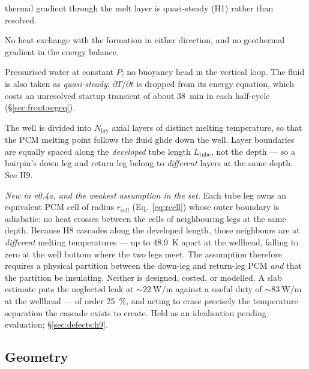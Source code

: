 \begin{description}[leftmargin=1.6em,itemsep=2pt]
  thermal gradient through the melt layer is quasi-steady (H1) rather than
  resolved.
\item[H6 --- Adiabatic borehole wall.] No heat exchange with the formation in
  either direction, and no geothermal gradient in the energy balance.
\item[H7 --- Incompressible, single-phase secondary fluid.] Pressurised water at
  constant $P$; no buoyancy head in the vertical loop. The fluid is also taken
  as \emph{quasi-steady}: $\partial T/\partial t$ is dropped from its energy
  equation, which costs an unresolved startup transient of about
  \SI{38}{\minute} in each half-cycle (\S\ref{sec:front:segeq}).
\item[H8 --- Multilayer PCM.] The well is divided into $N_{\mathrm{lay}}$ axial
  layers of distinct melting temperature, so that the PCM melting point follows
  the fluid glide down the well. Layer boundaries are equally spaced along the
  \emph{developed} tube length $L_{\mathrm{tube}}$, not the depth --- so a
  hairpin's down leg and return leg belong to \emph{different} layers at the
  same depth. See H9.
\item[H9 --- Perfect azimuthal insulation.] \emph{New in v0.4a, and the
  weakest assumption in the set.} Each tube leg owns an equivalent PCM cell of
  radius $r_{\mathrm{cell}}$ (Eq.~\eqref{eq:rcell}) whose outer boundary is
  adiabatic: no heat crosses between the cells of neighbouring legs at the same
  depth. Because H8 cascades along the developed length, those neighbours are at
  \emph{different} melting temperatures --- up to \SI{48.9}{\kelvin} apart at
  the wellhead, falling to zero at the well bottom where the two legs meet. The
  assumption therefore requires a physical partition between the down-leg and
  return-leg PCM \emph{and} that the partition be insulating. Neither is
  designed, costed, or modelled. A slab estimate puts the neglected leak at
  $\sim\SI{22}{\watt\per\meter}$ against a useful duty of
  $\sim\SI{83}{\watt\per\meter}$ at the wellhead --- of order
  \SI{25}{\percent}, and acting to erase precisely the temperature separation
  the cascade exists to create. Held as an idealisation pending evaluation;
  \S\ref{sec:defects:h9}.
\end{description}

\subsection{Geometry}
\label{sec:overview:geometry}

